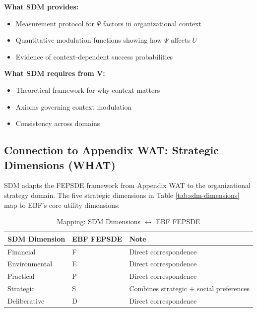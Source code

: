 \begin{tcolorbox}[colback=yellow!5!white, colframe=yellow!75!black,
    title=Integration: SDM $\leftrightarrow$ Appendix CTW (WHEN)]

\textbf{What SDM provides:}
\begin{itemize}[nosep]
\item Measurement protocol for $\Psi$ factors in organizational context
\item Quantitative modulation functions showing how $\Psi$ affects $U$
\item Evidence of context-dependent success probabilities
\end{itemize}

\textbf{What SDM requires from V:}
\begin{itemize}[nosep]
\item Theoretical framework for why context matters
\item Axioms governing context modulation
\item Consistency across domains
\end{itemize}

\end{tcolorbox}

\subsection{Connection to Appendix WAT: Strategic Dimensions (WHAT)}

SDM adapts the FEPSDE framework from Appendix WAT to the organizational strategy domain. The five strategic dimensions in Table \ref{tab:sdm-dimensions} map to EBF's core utility dimensions:

\begin{table}[htbp]
\centering
\caption{Mapping: SDM Dimensions $\leftrightarrow$ EBF FEPSDE}
\label{tab:sdm-fepsde-mapping}
\renewcommand{\arraystretch}{1.3}
\begin{tabular}{@{}lll@{}}
\toprule
\textbf{SDM Dimension} & \textbf{EBF FEPSDE} & \textbf{Note} \\
\midrule
Financial & F & Direct correspondence \\
Environmental & E & Direct correspondence \\
Practical & P & Direct correspondence \\
Strategic & S & Combines strategic + social preferences \\
Deliberative & D & Direct correspondence \\
\bottomrule
\end{tabular}
\end{table}

